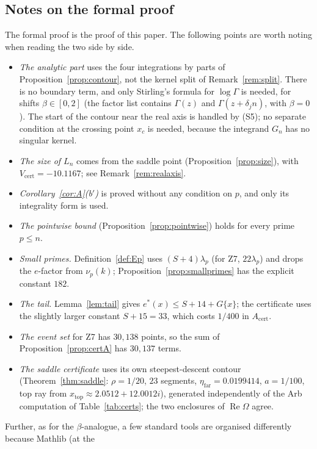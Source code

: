 \documentclass[11pt]{amsart}
\theoremstyle{definition}
\theoremstyle{remark}
\numberwithin{equation}{section}
\newcommand{\Acert}{A_{\mathrm{cert}}}
\newcommand{\Vcert}{V_{\mathrm{cert}}}
\newcommand{\etafar}{\eta_{\mathrm{far}}}
\newcommand{\xtop}{x_{\mathrm{top}}}
\renewcommand{\Re}{\operatorname{Re}}
\begin{document}
\subsection{Notes on the formal proof}\label{sec:lean-diff}
The formal proof is the proof of this paper. The following points are worth noting when reading the two side by
side.
\begin{itemize}
\item \emph{The analytic part} uses the four integrations by parts of Proposition~\ref{prop:contour}, not the kernel
  split of Remark~\ref{rem:split}. There is no boundary term, and only Stirling's formula for $\log\Gamma$ is needed,
  for shifts $\beta\in[0,2]$ (the factor list contains $\Gamma(z)$ and $\Gamma(z+\delta_jn)$, with $\beta=0$). The
  start of the contour near the real axis is handled by (S5); no separate condition at the crossing point $x_c$ is
  needed, because the integrand $G_n$ has no singular kernel.
\item \emph{The size of $L_n$} comes from the saddle point (Proposition~\ref{prop:size}), with
  $\Vcert=-10.1167$; see Remark~\ref{rem:realaxis}.
\item \emph{Corollary~\ref{cor:A}(b$'$)} is proved without any condition on $p$, and only its integrality form is
  used.
\item \emph{The pointwise bound} (Proposition~\ref{prop:pointwise}) holds for every prime $p\le n$.
\item \emph{Small primes.} Definition~\ref{def:Ep} uses $(S+4)\lambda_p$ (for Z7, $22\lambda_p$) and drops the
  $e$-factor from $\nu_p(k)$; Proposition~\ref{prop:smallprimes} has the explicit constant $182$.
\item \emph{The tail.} Lemma~\ref{lem:tail} gives $e^*(x)\le S+14+G\{x\}$; the certificate uses the slightly larger
  constant $S+15=33$, which costs $1/400$ in $\Acert$.
\item \emph{The event set} for Z7 has $30{,}138$ points, so the sum of Proposition~\ref{prop:certA} has $30{,}137$
  terms.
\item \emph{The saddle certificate} uses its own steepest-descent contour (Theorem~\ref{thm:saddle}: $\rho=1/20$,
  $23$ segments, $\etafar=0.0199414$, $a=1/100$, top ray from $\xtop\approx2.0512+12.0012i$), generated independently
  of the Arb computation of Table~\ref{tab:certs}; the two enclosures of $\Re\Omega$ agree.
\end{itemize}
Further, as for the $\beta$-analogue, a few standard tools are organised differently because Mathlib (at the
\end{document}
